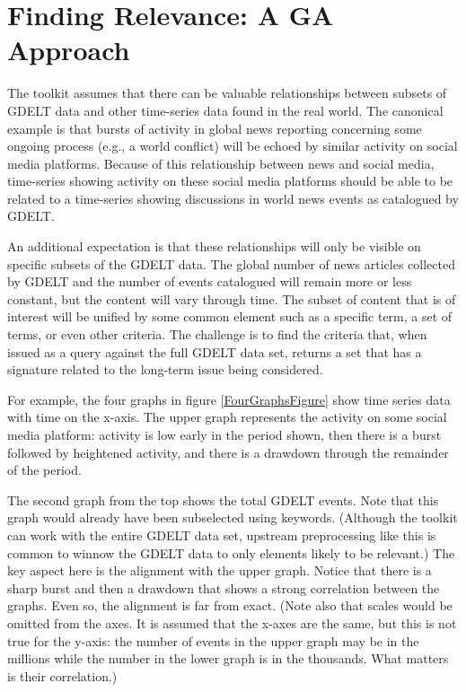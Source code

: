 \section{Finding Relevance: A GA Approach}

\par The \gdgas toolkit assumes that there can be valuable relationships between subsets of GDELT data and other time-series data found in the real world. The canonical example is that bursts of activity in global news reporting concerning some ongoing process (e.g., a world conflict) will be echoed by similar activity on social media platforms. Because of this relationship between news and social media, time-series showing activity on these social media platforms should be able to be related to a time-series showing discussions in world news events as catalogued by GDELT. 

\par An additional expectation is that these relationships will only be visible on specific subsets of the GDELT data. The global number of news articles collected by GDELT and the number of events catalogued will remain more or less constant, but the content will vary through time. The subset of content that is of interest will be unified by some common element such as a specific term, a set of terms, or even other criteria. The challenge is to find the criteria that, when issued as a query against the full GDELT data set, returns a set that has a signature related to the long-term issue being considered.

\par For example, the four graphs in figure \ref{FourGraphsFigure} show time series data with time on the x-axis. The upper graph represents the activity on some social media platform: activity is low early in the period shown, then there is a burst followed by heightened activity, and there is a drawdown through the remainder of the period.

\par The second graph from the top shows the total GDELT events. Note that this graph would already have been subselected using keywords. (Although the \gdgas toolkit can work with the entire GDELT data set, upstream preprocessing like this is common to winnow the GDELT data to only elements likely to be relevant.) The key aspect here is the alignment with the upper graph. Notice that there is a sharp burst and then a drawdown that shows a strong correlation between the graphs. Even so, the alignment is far from exact. (Note also that scales would be omitted from the axes. It is assumed that the x-axes are the same, but this is not true for the y-axis: the number of events in the upper graph may be in the millions while the number in the lower graph is in the thousands. What matters is their correlation.)

